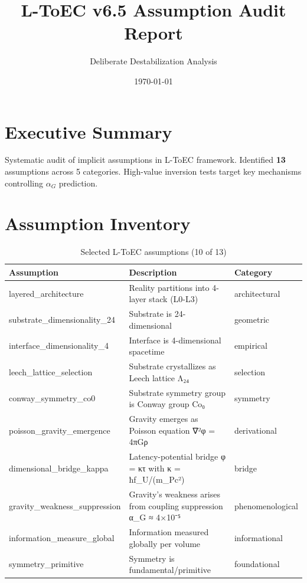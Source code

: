 \documentclass[11pt]{article}
\title{L-ToEC v6.5 Assumption Audit Report}
\author{Deliberate Destabilization Analysis}
\date{\today}
\begin{document}
\maketitle

\section*{Executive Summary}

Systematic audit of implicit assumptions in L-ToEC framework.
Identified \textbf{13} assumptions across
5 categories. High-value inversion tests target key mechanisms controlling
$\alpha_G$ prediction.

\section{Assumption Inventory}

\begin{table}[h!]
\centering
\begin{tabular}{p{}p{}p{}}
\toprule
\textbf{Assumption} & \textbf{Description} & \textbf{Category} \\
\midrule
layered\_architecture & Reality partitions into 4-layer stack (L0-L3) & architectural \\
\midrule
substrate\_dimensionality\_24 & Substrate is 24-dimensional & geometric \\
\midrule
interface\_dimensionality\_4 & Interface is 4-dimensional spacetime & empirical \\
\midrule
leech\_lattice\_selection & Substrate crystallizes as Leech lattice Λ₂₄ & selection \\
\midrule
conway\_symmetry\_co0 & Substrate symmetry group is Conway group Co₀ & symmetry \\
\midrule
poisson\_gravity\_emergence & Gravity emerges as Poisson equation ∇²φ = 4πGρ & derivational \\
\midrule
dimensional\_bridge\_kappa & Latency-potential bridge φ = κτ with κ = ħf_U/(m_Pc²) & bridge \\
\midrule
gravity\_weakness\_suppression & Gravity's weakness arises from coupling suppression α_G ≈ 4×10⁻⁵ & phenomenological \\
\midrule
information\_measure\_global & Information measured globally per volume & informational \\
\midrule
symmetry\_primitive & Symmetry is fundamental/primitive & foundational \\
\bottomrule
\end{tabular}
\caption{Selected L-ToEC assumptions (10 of 13)}
\end{table}
\end{document}
